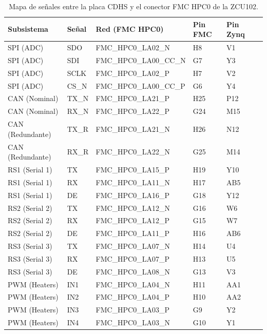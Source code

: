 \begin{table}[H]
    \centering
    \small
    \begin{tabular}{llllll}
        \hline
        \textbf{Subsistema} & \textbf{Señal} & \textbf{Red (FMC HPC0)} & \textbf{Pin FMC} & \textbf{Pin Zynq} \\
        \hline
        SPI (ADC) & SDO & FMC\_HPC0\_LA02\_N & H8 & V1 \\
        SPI (ADC) & SDI & FMC\_HPC0\_LA00\_CC\_N & G7 & Y3 \\
        SPI (ADC) & SCLK & FMC\_HPC0\_LA02\_P & H7 & V2 \\
        SPI (ADC) & CS\_N & FMC\_HPC0\_LA00\_CC\_P & G6 & Y4 \\
        CAN (Nominal) & TX\_N & FMC\_HPC0\_LA21\_P & H25 & P12 \\
        CAN (Nominal) & RX\_N & FMC\_HPC0\_LA22\_P & G24 & M15 \\
        CAN (Redundante) & TX\_R & FMC\_HPC0\_LA21\_N & H26 & N12 \\
        CAN (Redundante) & RX\_R & FMC\_HPC0\_LA22\_N & G25 & M14 \\
        RS1 (Serial 1) & TX & FMC\_HPC0\_LA15\_P & H19 & Y10 \\
        RS1 (Serial 1) & RX & FMC\_HPC0\_LA11\_N & H17 & AB5 \\
        RS1 (Serial 1) & DE & FMC\_HPC0\_LA16\_P & G18 & Y12 \\
        RS2 (Serial 2) & TX & FMC\_HPC0\_LA12\_N & G16 & W6 \\
        RS2 (Serial 2) & RX & FMC\_HPC0\_LA12\_P & G15 & W7 \\
        RS2 (Serial 2) & DE & FMC\_HPC0\_LA11\_P & H16 & AB6 \\
        RS3 (Serial 3) & TX & FMC\_HPC0\_LA07\_N & H14 & U4 \\
        RS3 (Serial 3) & RX & FMC\_HPC0\_LA07\_P & H13 & U5 \\
        RS3 (Serial 3) & DE & FMC\_HPC0\_LA08\_N & G13 & V3 \\
        PWM (Heaters) & IN1 & FMC\_HPC0\_LA04\_N & H11 & AA1 \\
        PWM (Heaters) & IN2 & FMC\_HPC0\_LA04\_P & H10 & AA2 \\
        PWM (Heaters) & IN3 & FMC\_HPC0\_LA03\_P & G9 & Y2 \\
        PWM (Heaters) & IN4 & FMC\_HPC0\_LA03\_N & G10 & Y1 \\
        \hline
    \end{tabular}
    \caption{Mapa de señales entre la placa CDHS y el conector FMC HPC0 de la ZCU102.}
    \label{tab:mapa_cdhs}
\end{table}

